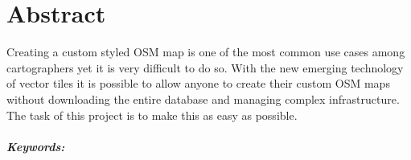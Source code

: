 

\begingroup
\let\clearpage\relax
\let\cleardoublepage\relax
\let\cleardoublepage\relax

\chapter*{Abstract} %

Creating a custom styled OSM map is one of the most common use cases among cartographers
yet it is very difficult to do so. With the new emerging technology of vector tiles it
is possible to allow anyone to create their custom OSM maps without downloading the
entire database and managing complex infrastructure. The task of this project is to
make this as easy as possible.

\endgroup			

\paragraph{Keywords:}\mbox{}\\
\textit{\myKeywords}

\vfill
